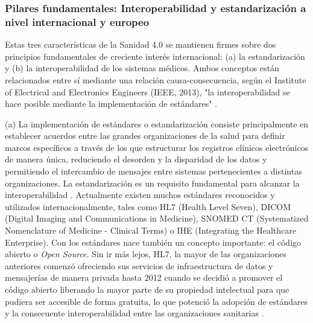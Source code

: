 
\subsubsection{Pilares fundamentales: Interoperabilidad y estandarización a nivel internacional y europeo}

Estas tres características de la Sanidad 4.0 se mantienen firmes sobre dos principios fundamentales de creciente interés internacional: (a) la estandarización y (b) la interoperabilidad de los sistemas médicos. Ambos conceptos están relacionados entre sí mediante una relación causa-consecuencia, según el Institute of Electrical and Electronics Engineers (IEEE, 2013), "la interoperabilidad se hace posible mediante la implementación de estándares" \cite{berryman2013data}.

(a) La implementación de estándares o estandarización consiste principalmente en establecer acuerdos entre las grandes organizaciones de la salud para definir marcos específicos a través de los que estructurar los registros clínicos electrónicos de manera única, reduciendo el desorden y la disparidad de los datos y permitiendo el intercambio de mensajes entre sistemas pertenecientes a distintas organizaciones. La estandarización es un requisito fundamental para alcanzar la interoperabilidad \cite{katehakis2019framework}. Actualmente existen muchos estándares reconocidos y utilizados internacionalmente, tales como HL7 (Health Level Seven), DICOM (Digital Imaging and Communications in Medicine), SNOMED CT (Systematized Nomenclature of Medicine - Clinical Terms) o IHE (Integrating the Healthcare Enterprise). Con los estándares nace también un concepto importante: el código abierto o \textit{Open Source}. Sin ir más lejos, HL7, la mayor de las organizaciones anteriores comenzó ofreciendo sus servicios de infraestructura de datos y mensajerías de manera privada hasta 2012 cuando se decidió a promover el código abierto liberando la mayor parte de su propiedad intelectual para que pudiera ser accesible de forma gratuita, lo que potenció la adopción de estándares y la consecuente interoperabilidad entre las organizaciones sanitarias \cite{berryman2013data}.

